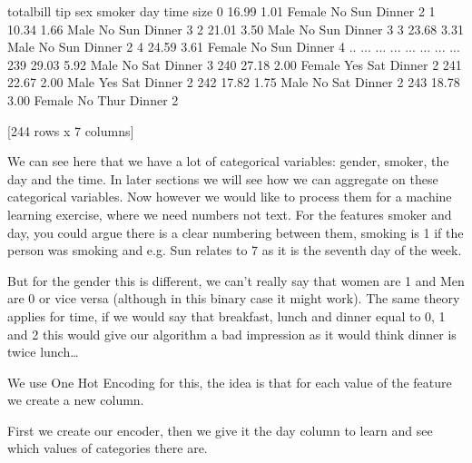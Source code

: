 \documentclass[letterpaper,10pt,english]{jupyterBook}
\begin{document}
\begin{sphinxVerbatim}[commandchars=\\\{\}]
     total\PYGZus{}bill   tip     sex smoker   day    time  size
0         16.99  1.01  Female     No   Sun  Dinner     2
1         10.34  1.66    Male     No   Sun  Dinner     3
2         21.01  3.50    Male     No   Sun  Dinner     3
3         23.68  3.31    Male     No   Sun  Dinner     2
4         24.59  3.61  Female     No   Sun  Dinner     4
..          ...   ...     ...    ...   ...     ...   ...
239       29.03  5.92    Male     No   Sat  Dinner     3
240       27.18  2.00  Female    Yes   Sat  Dinner     2
241       22.67  2.00    Male    Yes   Sat  Dinner     2
242       17.82  1.75    Male     No   Sat  Dinner     2
243       18.78  3.00  Female     No  Thur  Dinner     2

[244 rows x 7 columns]
\end{sphinxVerbatim}

\sphinxAtStartPar
We can see here that we have a lot of categorical variables: gender, smoker, the day and the time.
In later sections we will see how we can aggregate on these categorical variables.
Now however we would like to process them for a machine learning exercise, where we need numbers not text.
For the features smoker and day, you could argue there is a clear numbering between them, smoking is 1 if the person was smoking and e.g. Sun relates to 7 as it is the seventh day of the week.

\sphinxAtStartPar
But for the gender this is different, we can’t really say that women are 1 and Men are 0 or vice versa (although in this binary case it might work).
The same theory applies for time, if we would say that breakfast, lunch and dinner equal to 0, 1 and 2 this would give our algorithm a bad impression as it would think dinner is twice lunch…

\sphinxAtStartPar
We use One Hot Encoding for this, the idea is that for each value of the feature we create a new column.

\begin{sphinxVerbatim}[commandchars=\\\{\}]
   
\end{sphinxVerbatim}

\sphinxAtStartPar
First we create our encoder, then we give it the day column to learn and see which values of categories there are.
\end{document}
